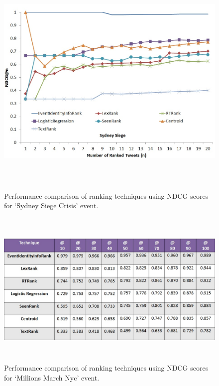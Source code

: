 \begin{figure}[htbp]
\centering
\includegraphics[height=4.5in,width=6in]{Figures/EventIdentityInfoRankPerformanceSydneySiege.jpg}
\caption{\small Performance comparison of ranking techniques using NDCG scores for `Sydney Siege Crisis' event.}
\label{sydneysiegendcg}
\end{figure}






\begin{figure}[htbp]
\centering
\includegraphics[height=3in,width=5.5in]{Figures/MillionsMarchNycCorrectedNDCG.jpg}
\caption{Performance comparison of ranking techniques using NDCG scores for `Millions March Nyc' event.}
\label{millionsmarchndcgtable}
\end{figure}

